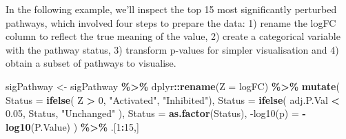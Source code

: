\documentclass[9pt,a4paper,]{extarticle}
\newenvironment{Shaded}{\begin{snugshade}}{\end{snugshade}}
\newcommand{\AttributeTok}[1]{\textcolor[rgb]{0.13,0.29,0.53}{#1}}
\newcommand{\DecValTok}[1]{\textcolor[rgb]{0.00,0.00,0.81}{#1}}
\newcommand{\FloatTok}[1]{\textcolor[rgb]{0.00,0.00,0.81}{#1}}
\newcommand{\FunctionTok}[1]{\textcolor[rgb]{0.13,0.29,0.53}{\textbf{#1}}}
\newcommand{\NormalTok}[1]{#1}
\newcommand{\OtherTok}[1]{\textcolor[rgb]{0.56,0.35,0.01}{#1}}
\newcommand{\SpecialCharTok}[1]{\textcolor[rgb]{0.81,0.36,0.00}{\textbf{#1}}}
\newcommand{\StringTok}[1]{\textcolor[rgb]{0.31,0.60,0.02}{#1}}
\begin{document}
In the following example, we'll inspect the top 15 most significantly perturbed pathways, which involved four steps to prepare the data: 1) rename the logFC column to reflect the true meaning of the value, 2) create a categorical variable with the pathway status, 3) transform p-values for simpler visualisation and 4) obtain a subset of pathways to visualise.

\begin{Shaded}
\begin{Highlighting}[]
\NormalTok{sigPathway }\OtherTok{\textless{}{-}}\NormalTok{ sigPathway }\SpecialCharTok{\%\textgreater{}\%}
\NormalTok{    dplyr}\SpecialCharTok{::}\FunctionTok{rename}\NormalTok{(}\AttributeTok{Z =}\NormalTok{ logFC) }\SpecialCharTok{\%\textgreater{}\%} 
    \FunctionTok{mutate}\NormalTok{(}
        \AttributeTok{Status =} \FunctionTok{ifelse}\NormalTok{(}
\NormalTok{            Z }\SpecialCharTok{\textgreater{}} \DecValTok{0}\NormalTok{, }\StringTok{"Activated"}\NormalTok{, }\StringTok{"Inhibited"}\NormalTok{), }
        \AttributeTok{Status =} \FunctionTok{ifelse}\NormalTok{(}
\NormalTok{            adj.P.Val }\SpecialCharTok{\textless{}} \FloatTok{0.05}\NormalTok{, Status, }\StringTok{"Unchanged"}
\NormalTok{        ), }
        \AttributeTok{Status =} \FunctionTok{as.factor}\NormalTok{(Status),}
        \StringTok{\textasciigrave{}}\AttributeTok{{-}log10(p)}\StringTok{\textasciigrave{}} \OtherTok{=} \SpecialCharTok{{-}}\FunctionTok{log10}\NormalTok{(P.Value)}
\NormalTok{    )  }\SpecialCharTok{\%\textgreater{}\%} 
\NormalTok{    .[}\DecValTok{1}\SpecialCharTok{:}\DecValTok{15}\NormalTok{,]}
\end{Highlighting}
\end{Shaded}
\end{document}
